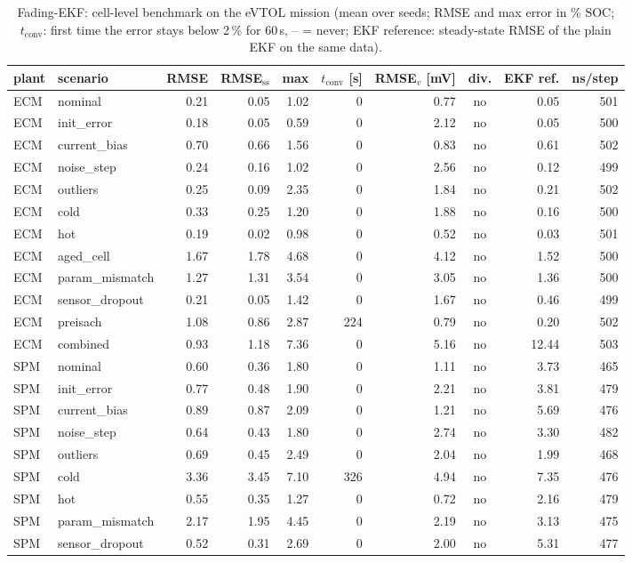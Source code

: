 \begin{table}[H]\centering\footnotesize\setlength{\tabcolsep}{4pt}
\caption{Fading-EKF: cell-level benchmark on the eVTOL mission (mean over seeds; RMSE and max error in \% SOC; $t_\mathrm{conv}$: first time the error stays below 2\,\% for 60\,s, -- = never; EKF reference: steady-state RMSE of the plain EKF on the same data).}\label{tab:cell_FadingEKF}
\begin{tabular}{llrrrrrcrr}\toprule
plant & scenario & RMSE & RMSE$_\mathrm{ss}$ & max & $t_\mathrm{conv}$ [s] & RMSE$_v$ [mV] & div. & EKF ref. & ns/step \\ \midrule
ECM & nominal & 0.21 & 0.05 & 1.02 & 0 & 0.77 & no & 0.05 & 501 \\
ECM & init\_error & 0.18 & 0.05 & 0.59 & 0 & 2.12 & no & 0.05 & 500 \\
ECM & current\_bias & 0.70 & 0.66 & 1.56 & 0 & 0.83 & no & 0.61 & 502 \\
ECM & noise\_step & 0.24 & 0.16 & 1.02 & 0 & 2.56 & no & 0.12 & 499 \\
ECM & outliers & 0.25 & 0.09 & 2.35 & 0 & 1.84 & no & 0.21 & 502 \\
ECM & cold & 0.33 & 0.25 & 1.20 & 0 & 1.88 & no & 0.16 & 500 \\
ECM & hot & 0.19 & 0.02 & 0.98 & 0 & 0.52 & no & 0.03 & 501 \\
ECM & aged\_cell & 1.67 & 1.78 & 4.68 & 0 & 4.12 & no & 1.52 & 500 \\
ECM & param\_mismatch & 1.27 & 1.31 & 3.54 & 0 & 3.05 & no & 1.36 & 500 \\
ECM & sensor\_dropout & 0.21 & 0.05 & 1.42 & 0 & 1.67 & no & 0.46 & 499 \\
ECM & preisach & 1.08 & 0.86 & 2.87 & 224 & 0.79 & no & 0.20 & 502 \\
ECM & combined & 0.93 & 1.18 & 7.36 & 0 & 5.16 & no & 12.44 & 503 \\
\midrule
SPM & nominal & 0.60 & 0.36 & 1.80 & 0 & 1.11 & no & 3.73 & 465 \\
SPM & init\_error & 0.77 & 0.48 & 1.90 & 0 & 2.21 & no & 3.81 & 479 \\
SPM & current\_bias & 0.89 & 0.87 & 2.09 & 0 & 1.21 & no & 5.69 & 476 \\
SPM & noise\_step & 0.64 & 0.43 & 1.80 & 0 & 2.74 & no & 3.30 & 482 \\
SPM & outliers & 0.69 & 0.45 & 2.49 & 0 & 2.04 & no & 1.99 & 468 \\
SPM & cold & 3.36 & 3.45 & 7.10 & 326 & 4.94 & no & 7.35 & 476 \\
SPM & hot & 0.55 & 0.35 & 1.27 & 0 & 0.72 & no & 2.16 & 479 \\
SPM & param\_mismatch & 2.17 & 1.95 & 4.45 & 0 & 2.19 & no & 3.13 & 475 \\
SPM & sensor\_dropout & 0.52 & 0.31 & 2.69 & 0 & 2.00 & no & 5.31 & 477 \\
\bottomrule\end{tabular}\end{table}
